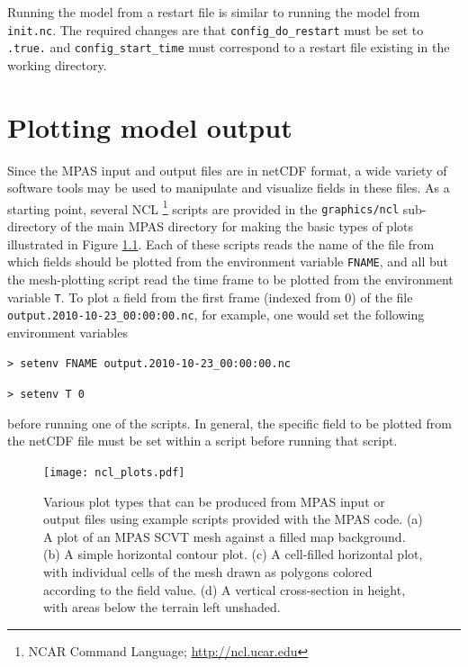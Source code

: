 \documentclass[11pt]{report}
\begin{document}
Running the model from a restart file is similar to running the model from {\tt init.nc}.  The required changes are that {\tt config\_do\_restart} must be set to {\tt .true.} and {\tt config\_start\_time} must correspond to a restart file existing in the working directory.



\chapter{Plotting model output}

Since the MPAS input and output files are in netCDF format, a wide variety of software
tools may be used to manipulate and visualize fields in these files. As a starting point, several NCL \footnote{NCAR Command Language; \url{http://ncl.ucar.edu}}
scripts are provided in the {\tt graphics/ncl} sub-directory
of the main MPAS directory for making the basic types of plots illustrated in Figure \ref{fig:ncl_plots}. Each of
these scripts reads the name of the file from which fields should be plotted from the environment variable {\tt FNAME},
and all but the mesh-plotting script read the time frame to be plotted from the environment variable {\tt T}. To plot
a field from the first frame (indexed from 0) of the file {\tt output.2010-10-23\_00:00:00.nc}, for example, one would set the 
following environment variables 

\vspace{12pt}
{\tt > setenv FNAME output.2010-10-23\_00:00:00.nc}

{\tt > setenv T 0}
\vspace{12pt}

\noindent before running one of the scripts. In general, the specific field to be plotted from the netCDF file must be set 
within a script before running that script. 

\begin{figure}[htb]
\begin{center}
\texttt{[image: ncl\_plots.pdf]}
\caption{Various plot types that can be produced from MPAS input or output files using example scripts provided with the MPAS code.
(a) A plot of an MPAS SCVT mesh against a filled map background. (b) A simple horizontal contour plot. (c) A cell-filled horizontal plot, with
individual cells of the mesh drawn as polygons colored according to the field value. (d) A vertical cross-section in height, with areas below the
terrain left unshaded.}
\label{fig:ncl_plots}
\end{center}
\end{figure}
\end{document}
